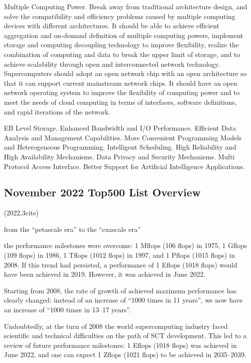 \documentclass[a4paper,twoside]{scrbook}
\begin{document}
Multiple Computing Power. Break away from traditional architecture design, and solve the compatibility and efficiency problems caused by multiple computing devices with different architectures. It should be able to achieve efficient aggregation and on-demand definition of multiple computing powers, implement storage and computing decoupling technology to improve flexibility, realize the combination of computing and data to break the upper limit of storage, and to achieve scalability through open and interconnected network technology. Supercomputers should adopt an open network chip with an open architecture so that it can support current mainstream network chips. It should have an open network operating system to improve the flexibility of computing power and to meet the needs of cloud computing in terms of interfaces, software definitions, and rapid iterations of the network.

EB Level Storage. Enhanced Bandwidth and I/O Performance. Efficient Data Analysis and Management Capabilities. More Convenient Programming Models and Heterogeneous Programming. Intelligent Scheduling. High Reliability and High Availability Mechanisms. Data Privacy and Security Mechanisms. Multi Protocol Access Interface. Better Support for Artificial Intelligence Applications. 



\subsection{November 2022 Top500 List Overview\cite{abramov2023november}}
(2022,3cite)\par

from the “petascale era” to the “exascale era”

the performance milestones were overcome: 1 Mflops (106 flops) in 1975, 1 Gflops (109 flops) in 1986, 1 Tflops (1012 flops) in 1997, and 1 Pflops (1015 flops) in 2008. If this trend had persisted, a performance of 1 Eflops (1018 flops) would have been achieved in 2019. However, it was achieved in June 2022.

Starting from 2008, the rate of growth of achieved maximum performance has clearly changed: instead of an increase of “1000 times in 11 years”, we now have an increase of “1000 times in 13–17 years”.

Undoubtedly, at the turn of 2008 the world supercomputing industry faced scientific and technical difficulties on the path of SCT development. This led to a review of future performance milestones: 1 Eflops (1018 flops) was achieved in June 2022, and one can expect 1 Zflops (1021 flops) to be achieved in 2035–2039.
\end{document}

